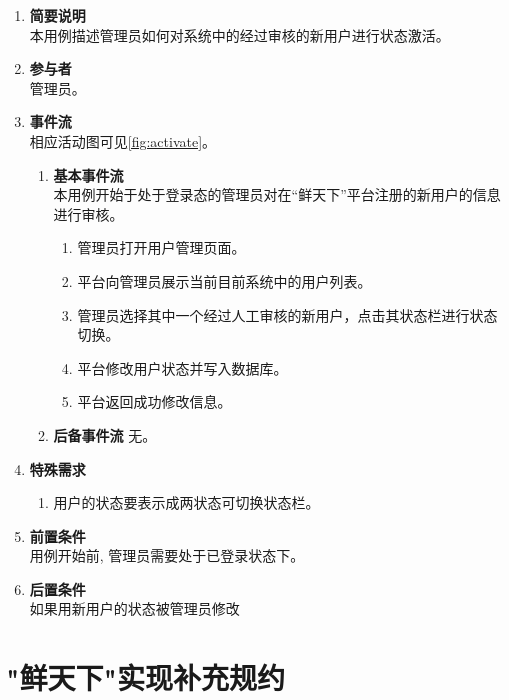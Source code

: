 \begin{enumerate}
	\item \textbf{简要说明}  \\ 本用例描述管理员如何对系统中的经过审核的新用户进行状态激活。
	\item \textbf{参与者} \\ 管理员。
	\item \textbf{事件流} \\ 相应活动图可见\autoref{fig:activate}。
	\begin{enumerate} 
        \item \textbf{基本事件流} \\ 本用例开始于处于登录态的管理员对在“鲜天下”平台注册的新用户的信息进行审核。
        \begin{enumerate}
            \item 管理员打开用户管理页面。
            \item 平台向管理员展示当前目前系统中的用户列表。
            \item 管理员选择其中一个经过人工审核的新用户，点击其状态栏进行状态切换。
            \item 平台修改用户状态并写入数据库。
            \item 平台返回成功修改信息。
        \end{enumerate}
        \item \textbf{后备事件流}
            无。
    \end{enumerate}
    \item \textbf{特殊需求}
    \begin{enumerate}
        \item 用户的状态要表示成两状态可切换状态栏。
    \end{enumerate}
    \item \textbf{前置条件} \\ 用例开始前, 管理员需要处于已登录状态下。
    \item \textbf{后置条件} \\ 如果用新用户的状态被管理员修改
\end{enumerate}




\section{"鲜天下"实现补充规约}

